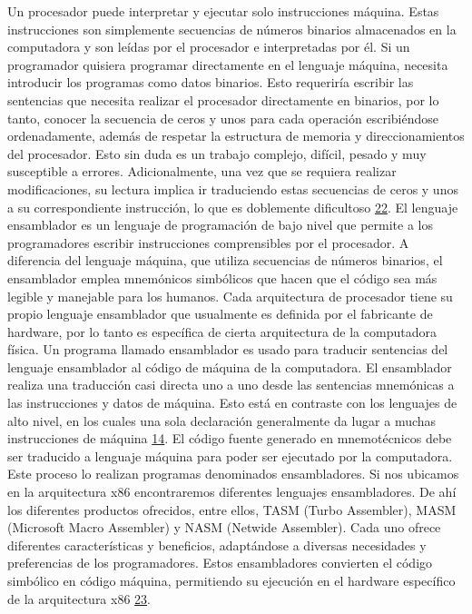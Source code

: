 \documentclass[12pt,twoside]{templates/unerthesis}
\begin{document}
Un procesador puede interpretar y ejecutar solo instrucciones máquina. Estas instrucciones son simplemente secuencias de números binarios almacenados en la computadora y son leídas por el procesador e interpretadas por él. Si un programador quisiera programar directamente en el lenguaje máquina, necesita introducir los programas como datos binarios. Esto requeriría escribir las sentencias que necesita realizar el procesador directamente en binarios, por lo tanto, conocer la secuencia de ceros y unos para cada operación escribiéndose ordenadamente, además de respetar la estructura de memoria y direccionamientos del procesador. Esto sin duda es un trabajo complejo, difícil, pesado y muy susceptible a errores. Adicionalmente, una vez que se requiera realizar modificaciones, su lectura implica ir traduciendo estas secuencias de ceros y unos a su correspondiente instrucción, lo que es doblemente dificultoso \protect\hyperlink{ref-irvine2011assembly}{22}.
El lenguaje ensamblador es un lenguaje de programación de bajo nivel que permite a los programadores escribir instrucciones comprensibles por el procesador. A diferencia del lenguaje máquina, que utiliza secuencias de números binarios, el ensamblador emplea mnemónicos simbólicos que hacen que el código sea más legible y manejable para los humanos. Cada arquitectura de procesador tiene su propio lenguaje ensamblador que usualmente es definida por el fabricante de hardware, por lo tanto es específica de cierta arquitectura de la computadora física. Un programa llamado ensamblador es usado para traducir sentencias del lenguaje ensamblador al código de máquina de la computadora. El ensamblador realiza una traducción casi directa uno a uno desde las sentencias mnemónicas a las instrucciones y datos de máquina. Esto está en contraste con los lenguajes de alto nivel, en los cuales una sola declaración generalmente da lugar a muchas instrucciones de máquina \protect\hyperlink{ref-stallings_computer_2013}{14}.
El código fuente generado en mnemotécnicos debe ser traducido a lenguaje máquina para poder ser ejecutado por la computadora. Este proceso lo realizan programas denominados ensambladores. Si nos ubicamos en la arquitectura x86 encontraremos diferentes lenguajes ensambladores. De ahí los diferentes productos ofrecidos, entre ellos, TASM (Turbo Assembler), MASM (Microsoft Macro Assembler) y NASM (Netwide Assembler). Cada uno ofrece diferentes características y beneficios, adaptándose a diversas necesidades y preferencias de los programadores. Estos ensambladores convierten el código simbólico en código máquina, permitiendo su ejecución en el hardware específico de la arquitectura x86 \protect\hyperlink{ref-hyde2010art}{23}.
\end{document}
